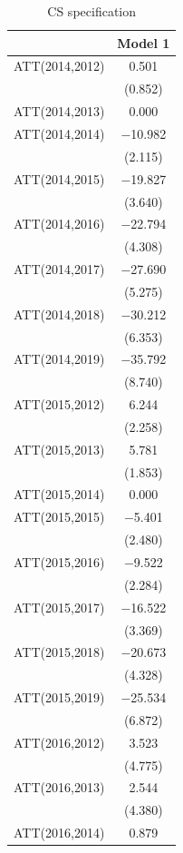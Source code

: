 \documentclass[
]{article}
\begin{document}
\begin{table}

\caption{\label{tab:table-4}CS specification}
\centering
\begin{tabular}[t]{lc}
\toprule
  & Model 1\\
\midrule
ATT(2014,2012) & \num{0.501}\\
 & (\num{0.852})\\
ATT(2014,2013) & \num{0.000}\\
ATT(2014,2014) & \num{-10.982}\\
 & (\num{2.115})\\
ATT(2014,2015) & \num{-19.827}\\
 & (\num{3.640})\\
ATT(2014,2016) & \num{-22.794}\\
 & (\num{4.308})\\
ATT(2014,2017) & \num{-27.690}\\
 & (\num{5.275})\\
ATT(2014,2018) & \num{-30.212}\\
 & (\num{6.353})\\
ATT(2014,2019) & \num{-35.792}\\
 & (\num{8.740})\\
ATT(2015,2012) & \num{6.244}\\
 & (\num{2.258})\\
ATT(2015,2013) & \num{5.781}\\
 & (\num{1.853})\\
ATT(2015,2014) & \num{0.000}\\
ATT(2015,2015) & \num{-5.401}\\
 & (\num{2.480})\\
ATT(2015,2016) & \num{-9.522}\\
 & (\num{2.284})\\
ATT(2015,2017) & \num{-16.522}\\
 & (\num{3.369})\\
ATT(2015,2018) & \num{-20.673}\\
 & (\num{4.328})\\
ATT(2015,2019) & \num{-25.534}\\
 & (\num{6.872})\\
ATT(2016,2012) & \num{3.523}\\
 & (\num{4.775})\\
ATT(2016,2013) & \num{2.544}\\
 & (\num{4.380})\\
ATT(2016,2014) & \num{0.879}\\

\end{tabular}
\end{table}
\end{document}
